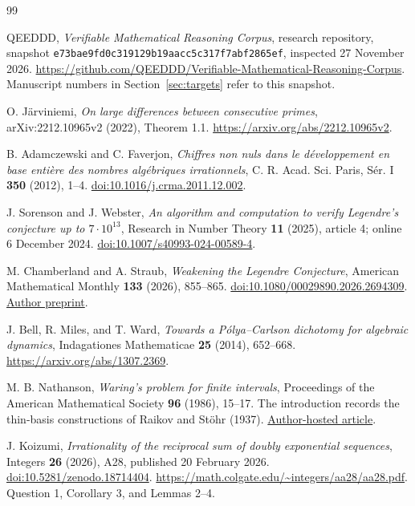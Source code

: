 \documentclass[11pt,a4paper]{article}
\theoremstyle{definition}
\theoremstyle{remark}\newtheorem{remark}[theorem]{Remark}
\begin{document}
\small
\begin{thebibliography}{99}

QEEDDD, \emph{Verifiable Mathematical Reasoning Corpus}, research
repository, snapshot \texttt{e73bae9fd0c319129b19aacc5c317f7abf2865ef},
inspected 27 November 2026.
\url{https://github.com/QEEDDD/Verifiable-Mathematical-Reasoning-Corpus}.
Manuscript numbers in Section~\ref{sec:targets} refer to this snapshot.

O. J\"arviniemi, \emph{On large differences between consecutive primes},
arXiv:2212.10965v2 (2022), Theorem 1.1.
\url{https://arxiv.org/abs/2212.10965v2}.

B. Adamczewski and C. Faverjon,
\emph{Chiffres non nuls dans le d\'eveloppement en base enti\`ere des
nombres alg\'ebriques irrationnels},
C. R. Acad. Sci. Paris, S\'er. I \textbf{350} (2012), 1--4.
\href{https://doi.org/10.1016/j.crma.2011.12.002}{doi:10.1016/j.crma.2011.12.002}.

J. Sorenson and J. Webster, \emph{An algorithm and computation to verify
Legendre's conjecture up to $7\cdot10^{13}$}, Research in Number
Theory \textbf{11} (2025), article 4; online 6 December 2024.
\href{https://doi.org/10.1007/s40993-024-00589-4}{doi:10.1007/s40993-024-00589-4}.

M. Chamberland and A. Straub, \emph{Weakening the Legendre Conjecture},
American Mathematical Monthly \textbf{133} (2026), 855--865.
\href{https://doi.org/10.1080/00029890.2026.2694309}{doi:10.1080/00029890.2026.2694309}.
\href{https://arminstraub.com/downloads/pub/legendre-riemann.pdf}{Author preprint}.

J. Bell, R. Miles, and T. Ward, \emph{Towards a P\'olya--Carlson
dichotomy for algebraic dynamics}, Indagationes Mathematicae
\textbf{25} (2014), 652--668.
\url{https://arxiv.org/abs/1307.2369}.

M. B. Nathanson, \emph{Waring's problem for finite intervals},
Proceedings of the American Mathematical Society \textbf{96}
(1986), 15--17. The introduction records the thin-basis
constructions of Raikov and St\"ohr (1937).
\href{https://www.theoryofnumbers.com/melnathanson/pdfs/nath1986-53.pdf}{Author-hosted article}.

J. Koizumi, \emph{Irrationality of the reciprocal sum of doubly
exponential sequences}, Integers \textbf{26} (2026), A28,
published 20 February 2026.
\href{https://doi.org/10.5281/zenodo.18714404}{doi:10.5281/zenodo.18714404}.
\url{https://math.colgate.edu/~integers/aa28/aa28.pdf}.
Question 1, Corollary 3, and Lemmas 2--4.


\end{thebibliography}
\end{document}
